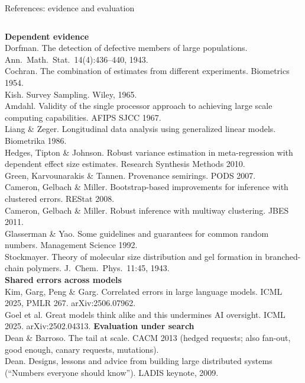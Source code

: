 \begin{frame}[t]{References: evidence and evaluation}
\vspace{0pt}
{\fontsize{6.0}{6.9}\selectfont
\begin{columns}[T,onlytextwidth]
\textbf{Dependent evidence}\\
Dorfman. The detection of defective members of large populations. Ann.\ Math.\ Stat.\ 14(4):436--440, 1943.\\
Cochran. The combination of estimates from different experiments. Biometrics 1954.\\
Kish. Survey Sampling. Wiley, 1965.\\
Amdahl. Validity of the single processor approach to achieving large scale computing capabilities. AFIPS SJCC 1967.\\
Liang \& Zeger. Longitudinal data analysis using generalized linear models. Biometrika 1986.\\
Hedges, Tipton \& Johnson. Robust variance estimation in meta-regression with dependent effect size estimates. Research Synthesis Methods 2010.\\
Green, Karvounarakis \& Tannen. Provenance semirings. PODS 2007.\\
Cameron, Gelbach \& Miller. Bootstrap-based improvements for inference with clustered errors. REStat 2008.\\
Cameron, Gelbach \& Miller. Robust inference with multiway clustering. JBES 2011.\\
Glasserman \& Yao. Some guidelines and guarantees for common random numbers. Management Science 1992.\\
Stockmayer. Theory of molecular size distribution and gel formation in branched-chain polymers. J.\ Chem.\ Phys.\ 11:45, 1943.\\
\textbf{Shared errors across models}\\
Kim, Garg, Peng \& Garg. Correlated errors in large language models. ICML 2025, PMLR 267. arXiv:2506.07962.\\
Goel et al. Great models think alike and this undermines AI oversight. ICML 2025. arXiv:2502.04313.
\textbf{Evaluation under search}\\
Dean \& Barroso. The tail at scale. CACM 2013 (hedged requests; also fan-out, good enough, canary requests, mutations).\\
Dean. Designs, lessons and advice from building large distributed systems (``Numbers everyone should know''). LADIS keynote, 2009.\\

\end{columns}}
\end{frame}
